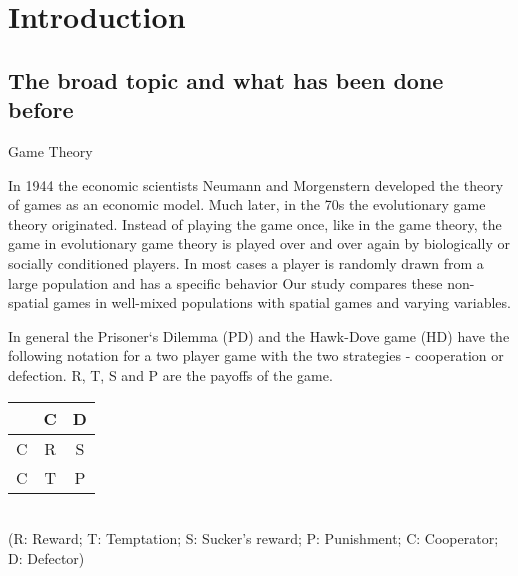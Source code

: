 \section{Introduction}

\subsection{The broad topic and what has been done before}

Game Theory

In 1944 the economic scientists Neumann and Morgenstern developed the theory of games as an economic model. Much later, in the 70s the evolutionary game theory originated. Instead of playing the game once, like in the game theory, the game in evolutionary game theory is played over and over again by biologically or socially conditioned players. In most cases a player is randomly drawn from a large population and has a specific behavior \citep{weibull1997} Our study compares these non-spatial games in well-mixed populations with spatial games and varying variables.

In general the Prisoner`s Dilemma (PD) and the Hawk-Dove game (HD) have the following notation for a two player game with the two strategies - cooperation or defection. R, T, S and P are the payoffs of the game.
\newline\\
\begin{tabular}{|c|c|c|}
		\hline  & C & D \\ 
		\hline C & R & S \\ 
		\hline C & T & P \\ 
		\hline 
\end{tabular} \\
(R: Reward; T: Temptation; S: Sucker's reward; P: Punishment; C: Cooperator; D: Defector)


